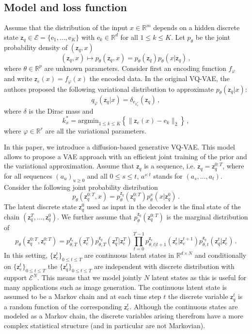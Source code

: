 \documentclass[nolayout]{article}
\theoremstyle{plain}
\theoremstyle{definition}
\theoremstyle{remark}
\newcommand{\rset}{\mathbb{R}}
\newcommand{\latentcont}{\mathsf{z}_e}
\newcommand{\latentdis}{\mathsf{z}_q}
\newcommand{\rme}{\mathrm{e}}
\newcommand{\embedspace}{\mathcal{E}}
\newcommand{\embed}{\rme}
\begin{document}
 \subsection{Model and loss function}
 Assume that the distribution of the input $x\in\rset^m$ depends on a hidden discrete state $\latentdis\in\embedspace = \{\embed_1,\ldots,\embed_K\}$ with $\embed_k\in\rset^d$ for all $1\leqslant k \leqslant K$. Let $p_\theta$ be the joint probability density of $(\latentdis,x)$
 $$
 (\latentdis,x)\mapsto p_\theta(\latentdis,x) =  p_\theta(\latentdis) p_\theta(x|\latentdis)\,,
 $$
 where $\theta\in\rset^p$ are unknown parameters.
Consider first an encoding function $f_\varphi$ and write $\latentcont(x)= f_\varphi(x)$ the encoded data. In the original VQ-VAE, the authors proposed the following variational distribution to approximate $p_\theta(\latentdis|x)$:
 $$
  q_\varphi(\latentdis|x) = \delta_{\embed_{k^*_x}}(\latentdis)\,,
  $$
  where $\delta$ is the Dirac mass and
 $$
  k^*_x = \mathrm{argmin}_{1\leqslant k \leqslant K}\left\{\|\latentcont(x)-\embed_k\|_2\right\}\,,
 $$
  where $\varphi\in\rset^r$ are all the variational parameters.


In this paper, we introduce a diffusion-based generative VQ-VAE. This model allows to propose a VAE approach with an efficient joint training of the prior and the variational approximation. 
Assume that $\latentdis$ is a sequence, i.e.  $\latentdis= \latentdis^{0:T}$, where for all sequences $(a_u)_{u\geqslant 0}$ and all $0\leqslant s\leqslant t$, $a^{s:t}$ stands for $(a_s,\ldots,a_t)$. Consider the following joint probability distribution 
$$
p_{\theta}(\latentdis^{0:T},x) = p^{\latentdis}_{\theta}(\latentdis^{0:T})p^x_{\theta}(x|\latentdis^{0})\,.
$$ 
The latent discrete state $\latentdis^0$ used as input in the decoder  is the final state of the chain $(\latentdis^T,\ldots,\latentdis^0)$. We further assume that $p_{\theta}^{\latentdis}(\latentdis^{0:T})$ is the marginal distribution of  
$$
p_{\theta}(\latentdis^{0:T},\latentcont^{0:T}) 
= p^{\latentcont}_{\theta,T}(\latentcont^T) p^{\latentdis}_{\theta,T}(\latentdis^T|\latentcont^T)\prod_{t=0}^{T-1}p^{\latentcont}_{\theta,t|t+1}(\latentcont^t|\latentcont^{t+1})p^{\latentdis}_{\theta,t}(\latentdis^t|\latentcont^t)\,.
$$
In this setting, $\{\latentcont^t\}_{0\leqslant t\leqslant T}$ are continuous latent states in $\mathbb{R}^{d\times N}$ and conditionally on $\{\latentcont^t\}_{0\leqslant t\leqslant T}$ the $\{\latentdis^t\}_{0\leqslant t\leqslant T}$ are independent with discrete distribution with support $\embedspace^N$. This means that we model jointly $N$  latent states as this is useful for many applications such as image generation. 
The continuous latent state is assumed to be a Markov chain and at each time step $t$ the discrete variable $\latentdis^t$ is a random function of the corresponding $\latentcont^t$.  Although the continuous states are modeled as a Markov chain, the discrete variables arising therefrom have a more complex statistical structure (and in particular are not Markovian).
\end{document}
